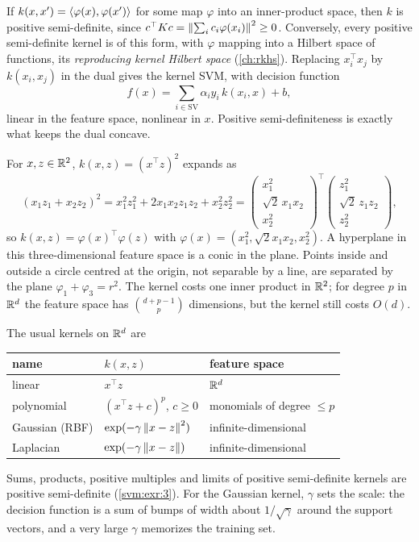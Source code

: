 \begin{notechapter}
If $k(x, x') = \left\langle \varphi(x), \varphi(x') \right\rangle$ for some map $\varphi$ into an inner-product space, then $k$ is positive
semi-definite, since $c^\top Kc = \left\|\sum_ic_i\varphi(x_i)\right\|^2\geq0$. Conversely, every positive semi-definite
kernel is of this form, with $\varphi$ mapping into a Hilbert space of functions, its
\emph{reproducing kernel Hilbert space} (\cref{ch:rkhs}). Replacing $x_i^\top x_j$ by $k(x_i, x_j)$ in the
dual gives the kernel SVM, with decision function
\[
  f(x) = \sum_{i\in\mathrm{SV}}\alpha_iy_i\,k(x_i, x) + b,
\]
linear in the feature space, nonlinear in $x$. Positive semi-definiteness is exactly what
keeps the dual concave.

\begin{example}\label{svm:ex:poly}
For $x, z\in\mathbb{R}^2$, $k(x, z) = (x^\top z)^2$ expands as
\[
  (x_1z_1 + x_2z_2)^2 = x_1^2z_1^2 + 2x_1x_2z_1z_2 + x_2^2z_2^2
  = \begin{pmatrix}x_1^2\\\sqrt2\,x_1x_2\\x_2^2\end{pmatrix}^{\!\top}\begin{pmatrix}z_1^2\\\sqrt2\,z_1z_2\\z_2^2\end{pmatrix},
\]
so $k(x, z) = \varphi(x)^\top\varphi(z)$ with $\varphi(x) = (x_1^2, \sqrt2x_1x_2, x_2^2)$. A hyperplane in this three-dimensional
feature space is a conic in the plane. Points inside and outside a circle centred at
the origin, not separable by a line, are separated by the plane $\varphi_1 + \varphi_3 = r^2$. The kernel
costs one inner product in $\mathbb{R}^2$; for degree $p$ in $\mathbb{R}^d$ the feature space has
$\binom{d + p - 1}p$ dimensions, but the kernel still costs $O(d)$.
\end{example}

The usual kernels on $\mathbb{R}^d$ are
\begin{center}
\begin{tabular}{@{}lll@{}}
\toprule
name & $k(x, z)$ & feature space \\
\midrule
linear & $x^\top z$ & $\mathbb{R}^d$ \\
polynomial & $(x^\top z + c)^p$, $c\geq0$ & monomials of degree $\leq p$ \\
Gaussian (RBF) & $\exp(-\gamma\left\|x - z\right\|^2)$ & infinite-dimensional \\
Laplacian & $\exp(-\gamma\left\|x - z\right\|)$ & infinite-dimensional \\
\bottomrule
\end{tabular}
\end{center}
Sums, products, positive multiples and limits of positive semi-definite kernels are
positive semi-definite (\cref{svm:exr:3}). For the Gaussian kernel, $\gamma$ sets the scale: the
decision function is a sum of bumps of width about $1/\sqrt\gamma$ around the support vectors,
and a very large $\gamma$ memorizes the training set.


\end{notechapter}
